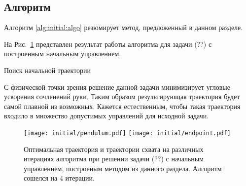 \documentclass[../../doc.tex]{subfiles}
\begin{document}
    \subsection{Алгоритм}

    Алгоритм \ref{alg:initial:algo} резюмирует метод, предложенный в данном разделе.

    На Рис.~\ref{fig:initial:pendulum} представлен результат работы алгоритма для задачи (??) с построенным начальным управлением.
    

    \begin{rusalgorithm}\caption{Поиск начальной траектории}\label{alg:initial:algo}
        \DontPrintSemicolon
        
    \end{rusalgorithm}

    \begin{remark}
        С физической точки зрения решение данной задачи минимизирует угловые ускорения сочленений руки.
        Таким образом результирующая траектория будет самой плавной из возможных.
        Кажется естественным, чтобы такая траектория входило в множество допустимых управлений для исходной задачи.
    \end{remark}

    \begin{figure}[h]
        \begin{center}
            \texttt{[image: initial/pendulum.pdf]}
            \texttt{[image: initial/endpoint.pdf]}
        \end{center}
        \caption{
            Оптимальная траектория и траектории схвата на различных итерациях алгоритма при решении задачи (??) с начальным управлением, построеным методом из данного раздела.
            Алгоритм сошелся на $4$ итерации.
        }
        \label{fig:initial:pendulum}
    \end{figure}

    \ifSubfilesClassLoaded{
        \nocite{*}
        \clearpage
        
        
    }{}
\end{document}
